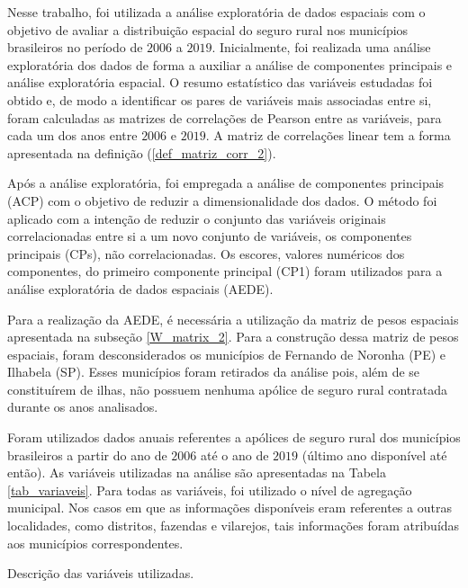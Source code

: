 Nesse trabalho, foi utilizada a análise exploratória de dados espaciais com o objetivo de avaliar a distribuição espacial do seguro rural nos municípios brasileiros no período de $2006$ a $2019$. Inicialmente, foi realizada uma análise exploratória dos dados de forma a auxiliar a análise de componentes principais e análise exploratória espacial. O resumo estatístico das variáveis estudadas foi obtido e, de modo a identificar os pares de variáveis mais associadas entre si, foram calculadas as matrizes de correlações de Pearson entre as variáveis, para cada um dos anos entre $2006$ e $2019$. A matriz de correlações linear tem a forma apresentada na definição (\ref{def_matriz_corr_2}).

Após a análise exploratória, foi empregada a análise de componentes principais (ACP) com o objetivo de reduzir a dimensionalidade dos dados. O método foi aplicado com a intenção de reduzir o conjunto das variáveis originais correlacionadas entre si a um novo conjunto de variáveis, os componentes principais (CPs), não correlacionadas. Os escores, valores numéricos dos componentes, do primeiro componente principal (CP1) foram utilizados para a análise exploratória de dados espaciais (AEDE). 

Para a realização da AEDE, é necessária a utilização da matriz de pesos espaciais apresentada na subseção \ref{W_matrix_2}. Para a construção dessa matriz de pesos espaciais, foram desconsiderados os municípios de Fernando de Noronha (PE) e Ilhabela (SP). Esses municípios foram retirados da análise pois, além de se constituírem de ilhas, não possuem nenhuma apólice de seguro rural contratada durante os anos analisados. 

Foram utilizados dados anuais referentes a apólices de seguro rural dos municípios brasileiros a partir do ano de $2006$ até o ano de $2019$ (último ano disponível até então). As variáveis utilizadas na análise são apresentadas na Tabela \ref{tab_variaveis}. Para todas as variáveis, foi utilizado o nível de agregação municipal. Nos casos em que as informações disponíveis eram referentes a outras localidades, como distritos, fazendas e vilarejos, tais informações foram atribuídas aos municípios correspondentes. 

\begin{small}
\begin{table}[!htp]
\caption{Descrição das variáveis utilizadas.}\label{tab_variaveis}
 
\end{table}
\end{small}
	
